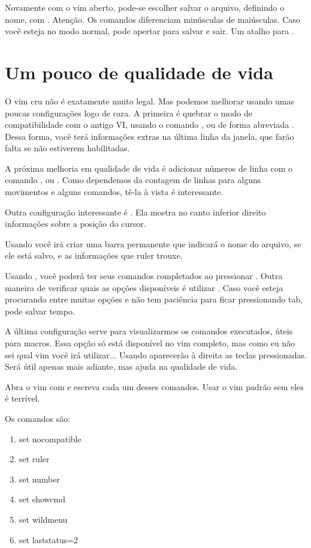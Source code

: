 Novamente com o vim aberto, pode-se escolher salvar o arquivo, definindo o nome, com .
Atenção. Os comandos diferenciam minúsculas de maiúsculas.
Caso você esteja no modo normal, pode apertar  para salvar e sair. Um atalho para .

\section{Um pouco de qualidade de vida}
O vim cru não é exatamente muito legal.
Mas podemos melhorar usando umas poucas configurações logo de cara.
A primeira é quebrar o modo de compatibilidade com o antigo VI, usando o comando ,
ou de forma abreviada .
Dessa forma, você terá informações extras na última linha da janela, que farão falta se não estiverem habilitadas.

A próxima melhoria em qualidade de vida é adicionar números de linha com o comando , ou .
Como dependemos da contagem de linhas para alguns movimentos e alguns comandos, tê-la à vista é interessante.

Outra configuração interessante é .
Ela mostra no canto inferior direito informações sobre a posição do cursor.

Usando  você irá criar uma barra permanente que indicará o nome do arquivo,
se ele está salvo, e as informações que ruler trouxe.

Usando , você poderá ter seus comandos completados ao pressionar .
Outra maneira de verificar quais as opções disponíveis é utilizar .
Caso você esteja procurando entre muitas opções e não tem paciência para ficar pressionando tab,
 pode salvar tempo.

A última configuração serve para visualizarmos os comandos executados, úteis para macros.
Essa opção só está disponível no vim completo, mas como eu não sei qual vim você irá utilizar...
Usando  aparecerão à direita as teclas pressionadas.
Será útil apenas mais adiante, mas ajuda na qualidade de vida.

Abra o vim com  e escreva cada um desses comandos.
Usar o vim padrão sem eles é terrível.

Os comandos são:

\begin{multicols}{2}
\begin{enumerate}
	\item set nocompatible
	\item set ruler
	\item set number
	\item set showcmd
	\item set wildmenu
	\item set laststatus=2
\end{enumerate}
\end{multicols}

